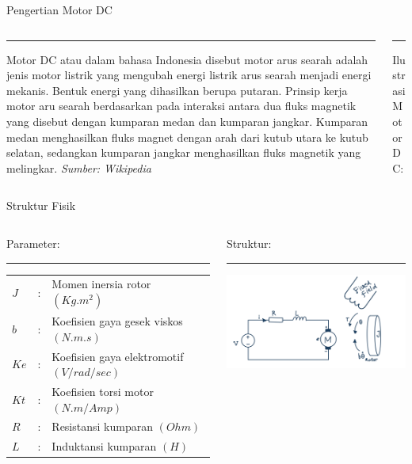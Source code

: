 \documentclass[10pt,xcolor={dvipsnames}]{beamer}
\begin{document}
	\begin{frame}{Pengertian Motor DC}
		\begin{columns}[T]%
			\begin{column}{0.48\textwidth}
				\color{black}\rule{\linewidth}{4pt}
				
					Motor DC atau dalam bahasa Indonesia disebut motor arus searah adalah jenis motor listrik yang mengubah energi listrik arus searah menjadi energi mekanis. Bentuk energi yang dihasilkan berupa putaran. Prinsip kerja motor aru searah berdasarkan pada interaksi antara dua fluks magnetik yang disebut dengan kumparan medan dan kumparan jangkar. Kumparan medan menghasilkan fluks magnet dengan arah dari kutub utara ke kutub selatan, sedangkan kumparan jangkar menghasilkan fluks magnetik yang melingkar. \newline \textit{Sumber: Wikipedia}		
			\end{column}%
			\hfill%
			\begin{column}{0.48\textwidth}
				\color{myNewColorA}\rule{\linewidth}{4pt}
				Ilustrasi Motor DC:\newline
			\end{column}
		\end{columns}
	\end{frame}
	\begin{frame}{Struktur Fisik}
		\begin{columns}[T] %
			\begin{column}{0.48\textwidth}
				Parameter:
				\color{black}\rule{\linewidth}{4pt}
					\begin{flushleft}
					\begin{tabular}{lll}
						$J$ &:& Momen inersia rotor $(Kg.m^2)$\\
						$b$ &:& Koefisien gaya gesek viskos $(N.m.s)$\\
						$Ke$ &:& Koefisien gaya elektromotif $(V/rad/sec)$\\
						$Kt$ &:& Koefisien torsi motor $(N.m/Amp)$\\
						$R$ &:& Resistansi kumparan $(Ohm)$\\
						$L$ &:& Induktansi kumparan $(H)$\\
					\end{tabular}
				\end{flushleft}
			\end{column}%
			\hfill%
			\begin{column}{0.48\textwidth}
				Struktur:\newline
				\color{myNewColorA}\rule{\linewidth}{4pt}
				\includegraphics[width=7.5cm]{Gambar Lain/Struktur.png}
			\end{column}
		\end{columns}
\end{frame}
\end{document}
